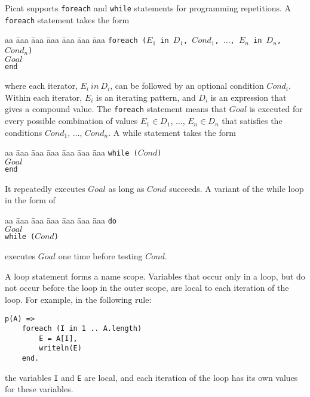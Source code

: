 Picat supports \texttt{foreach} and \texttt{while} statements for programming repetitions. A \texttt{foreach} statement takes the form
\begin{tabbing}
aa \= aaa \= aaa \= aaa \= aaa \= aaa \= aaa \kill
\> \texttt{foreach ($E_1$ in $D_1$, $Cond_1$, $\ldots$, $E_n$ in $D_n$, $Cond_n$)}  \\
\> \> $Goal$ \\
\>  \texttt{end} 
\end{tabbing}
where each iterator, $E_i\ in\ D_i$, can be followed by an optional condition $Cond_i$.  Within each iterator, $E_i$ is an iterating pattern, and $D_i$ is an expression that gives a compound value. The \texttt{foreach} statement means that $Goal$ is executed for every possible combination of values $E_1 \in D_1$, $\ldots$, $E_n \in D_n$ that satisfies the conditions \texttt{$Cond_1$}, $\ldots$, \texttt{$Cond_n$}. A while statement takes the form 
\begin{tabbing}
aa \= aaa \= aaa \= aaa \= aaa \= aaa \= aaa \kill
\> \texttt{while ($Cond$)} \\
\> \> $Goal$  \\
\>  \texttt{end}
\end{tabbing} 
It repeatedly executes $Goal$ as long as $Cond$ succeeds. A variant of the while loop in the form of 
\begin{tabbing}
aa \= aaa \= aaa \= aaa \= aaa \= aaa \= aaa \kill
\> \texttt{do} \\
\> \> $Goal$  \\
\>  \texttt{while ($Cond$)}
\end{tabbing}
executes $Goal$ one time before testing $Cond$.

A loop statement forms a name scope. Variables that occur only in a loop, but do not occur before the loop in the outer scope, are local to each iteration of the loop. For example, in the following rule:
\begin{verbatim}
p(A) =>
    foreach (I in 1 .. A.length)
        E = A[I],
        writeln(E)
    end.
\end{verbatim}
the variables \texttt{I} and \texttt{E} are local, and each iteration of the loop has its own values for these variables.

